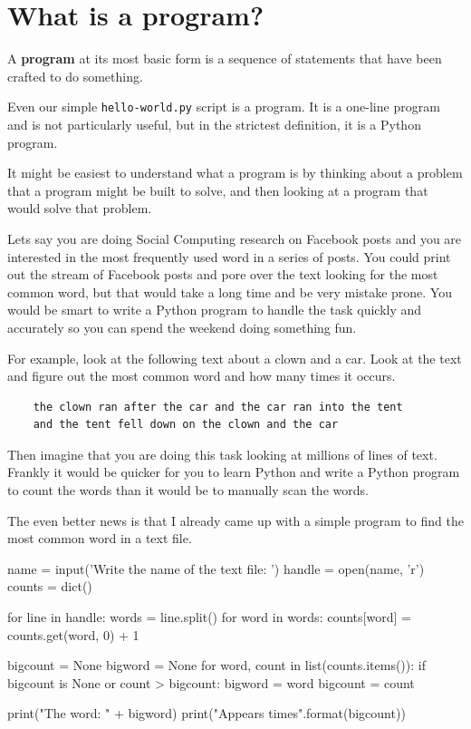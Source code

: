 \hypertarget{quuxe9-es-un-programa}{%
\section{What is a program?}\label{quuxe9-es-un-programa}}

\begin{definition}
A \textbf{program} at its most basic form is a sequence of statements that have been crafted to do something.
\end{definition}

Even our simple \verb|hello-world.py| script is a program. It is a one-line program and is not particularly useful, but in the strictest definition, it is a Python program.

It might be easiest to understand what a program is by thinking about a problem that a program might be built to solve, and then looking at a program that would solve that problem.

Lets say you are doing Social Computing research on Facebook posts and you are interested in the most frequently used word in a series of posts. You could print out the stream of Facebook posts and pore over the text looking for the most common word, but that would take a long time and be very mistake prone. You would be smart to write a Python program to handle the task quickly and accurately so you can spend the weekend doing something fun.

For example, look at the following text about a clown and a car. Look at the text and figure out the most common word and how many times it occurs.

\begin{verbatim}
    the clown ran after the car and the car ran into the tent
    and the tent fell down on the clown and the car
\end{verbatim}

Then imagine that you are doing this task looking at millions of lines of text. Frankly it would be quicker for you to learn Python and write a Python program to count the words than it would be to manually scan the words.

The even better news is that I already came up with a simple program to find the most common word in a text file.

\begin{python}
name = input('Write the name of the text file: ')
handle = open(name, 'r')
counts = dict()

for line in handle:
    words = line.split()
    for word in words:
        counts[word] = counts.get(word, 0) + 1

bigcount = None
bigword = None
for word, count in list(counts.items()):
    if bigcount is None or count > bigcount:
        bigword = word
        bigcount = count

print("The word: " + bigword)
print("Appears {} times".format(bigcount))
\end{python}


